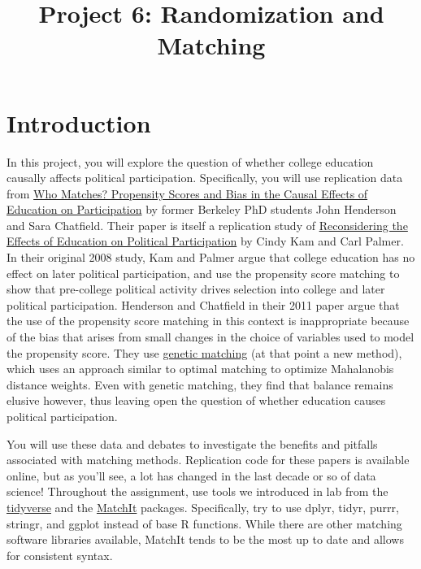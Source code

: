 \documentclass[
]{article}
\title{Project 6: Randomization and Matching}
\author{}
\date{\vspace{-2.5em}}
\begin{document}
\maketitle

\hypertarget{introduction}{%
\section{Introduction}\label{introduction}}

In this project, you will explore the question of whether college
education causally affects political participation. Specifically, you
will use replication data from
\href{https://papers.ssrn.com/sol3/papers.cfm?abstract_id=1409483}{Who Matches? Propensity Scores and Bias in the Causal Eﬀects of Education on Participation}
by former Berkeley PhD students John Henderson and Sara Chatfield. Their
paper is itself a replication study of
\href{https://www.jstor.org/stable/10.1017/s0022381608080651}{Reconsidering the Effects of Education on Political Participation}
by Cindy Kam and Carl Palmer. In their original 2008 study, Kam and
Palmer argue that college education has no effect on later political
participation, and use the propensity score matching to show that
pre-college political activity drives selection into college and later
political participation. Henderson and Chatfield in their 2011 paper
argue that the use of the propensity score matching in this context is
inappropriate because of the bias that arises from small changes in the
choice of variables used to model the propensity score. They use
\href{http://sekhon.berkeley.edu/papers/GenMatch.pdf}{genetic matching}
(at that point a new method), which uses an approach similar to optimal
matching to optimize Mahalanobis distance weights. Even with genetic
matching, they find that balance remains elusive however, thus leaving
open the question of whether education causes political participation.

You will use these data and debates to investigate the benefits and
pitfalls associated with matching methods. Replication code for these
papers is available online, but as you'll see, a lot has changed in the
last decade or so of data science! Throughout the assignment, use tools
we introduced in lab from the
\href{https://www.tidyverse.org/}{tidyverse} and the
\href{https://cran.r-project.org/web/packages/MatchIt/MatchIt.pdf}{MatchIt}
packages. Specifically, try to use dplyr, tidyr, purrr, stringr, and
ggplot instead of base R functions. While there are other matching
software libraries available, MatchIt tends to be the most up to date
and allows for consistent syntax.
\end{document}
